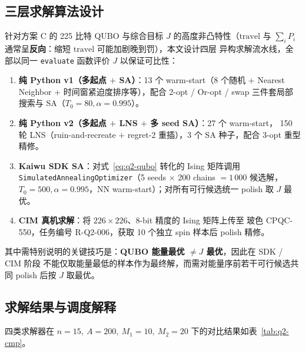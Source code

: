 \documentclass[UTF8,12pt,a4paper]{ctexart}
\begin{document}
\subsection{三层求解算法设计}
\label{subsec:q2-algo}

针对方案 C 的 225 比特 QUBO 与综合目标 $J$ 的高度非凸特性（$\mathrm{travel}$ 与
$\sum_i P_i$ 通常呈\textbf{反向}：缩短 $\mathrm{travel}$ 可能加剧晚到罚），本文设计四层
异构求解流水线，全部以同一 \texttt{evaluate} 函数评价 $J$ 以保证可比性：
\begin{enumerate}
  \item[(i)] \textbf{纯 Python v1（多起点 $+$ SA）}：13 个 warm-start（8 个随机 $+$
    Nearest Neighbor $+$ 时间窗紧迫度排序等），配合 2-opt / Or-opt / swap 三件套局部
    搜索与 SA（$T_0=80,\alpha=0.995$）。
  \item[(ii)] \textbf{纯 Python v2（多起点 $+$ LNS $+$ 多 seed SA）}：27 个 warm-start，
    150 轮 LNS（ruin-and-recreate $+$ regret-2 重插），3 个 SA 种子，配合 3-opt 重型精修。
  \item[(iii)] \textbf{Kaiwu SDK SA}：对式~\eqref{eq:q2-qubo} 转化的 Ising 矩阵调用
    \texttt{SimulatedAnnealingOptimizer}（5 seeds $\times$ 200 chains $=1\,000$ 候选解，
    $T_0=500,\alpha=0.995$，NN warm-start）；对所有可行候选统一 polish 取 $J$ 最优。
  \item[(iv)] \textbf{CIM 真机求解}：将 $226\times 226$、8-bit 精度的 Ising 矩阵上传至
    玻色 CPQC-550，任务编号 R-Q2-006，获取 10 个独立 spin 样本后 polish 精修。
\end{enumerate}
其中需特别说明的关键技巧是：\textbf{QUBO 能量最优 $\ne J$ 最优}，因此在 SDK / CIM 阶段
不能仅取能量最低的样本作为最终解，而需对能量序前若干可行候选共同 polish 后按 $J$ 取最优。

\subsection{求解结果与调度解释}
\label{subsec:q2-result}

四类求解器在 $n=15,\ A=200,\ M_1=10,\ M_2=20$ 下的对比结果如表~\ref{tab:q2-cmp}。
\end{document}
